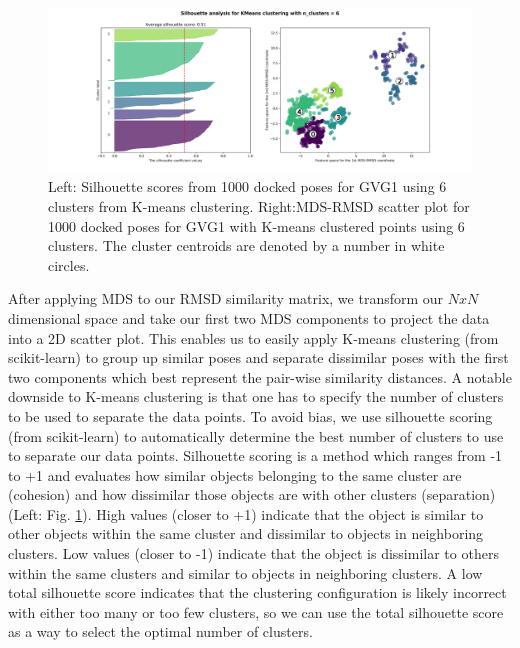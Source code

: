 \begin{figure}
    \centering
    \includegraphics{chapter6/Figures/GVG_1-mds_6.png}
    \caption[Silhouette scoring in MDS-RMSD space]{Left: Silhouette scores from 1000 docked poses for GVG1 using 6 clusters from K-means clustering. Right:MDS-RMSD scatter plot for 1000 docked poses for GVG1 with K-means clustered points using 6 clusters. The cluster centroids are denoted by a number in white circles.}
    \label{fig:mds}
\end{figure}

After applying MDS to our RMSD similarity matrix, we transform our $N x N$ dimensional space and take our first two MDS components to project the data into a 2D scatter plot.
This enables us to easily apply K-means clustering \cite{scikit_kmeans} (from scikit-learn) to group up similar poses and separate dissimilar poses with the first two components which best represent the pair-wise similarity distances.
A notable downside to K-means clustering is that one has to specify the number of clusters to be used to separate the data points.
To avoid bias, we use silhouette scoring \cite{scikit_silhouette} (from scikit-learn) to automatically determine the best number of clusters to use to separate our data points.
Silhouette scoring is a method which ranges from -1 to +1 and evaluates how similar objects belonging to the same cluster are (cohesion) and how dissimilar those objects are with other clusters (separation) (Left: Fig. \ref{fig:mds}).
High values (closer to +1) indicate that the object is similar to other objects within the same cluster and dissimilar to objects in neighboring clusters.
Low values (closer to -1) indicate that the object is dissimilar to others within the same clusters and similar to objects in neighboring clusters.
A low total silhouette score indicates that the clustering configuration is likely incorrect with either too many or too few clusters, so we can use the total silhouette score as a way to select the optimal number of clusters.

